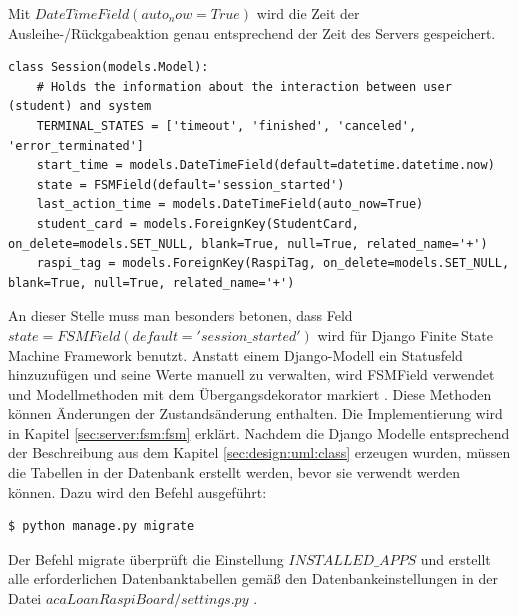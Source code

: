 Mit $DateTimeField(auto_now=True)$ wird die Zeit der Ausleihe-/Rückgabeaktion genau entsprechend der Zeit des Servers gespeichert. 
\begin{lstlisting}[caption={Session Modell},captionpos=b]
class Session(models.Model):
	# Holds the information about the interaction between user (student) and system
	TERMINAL_STATES = ['timeout', 'finished', 'canceled', 'error_terminated']
	start_time = models.DateTimeField(default=datetime.datetime.now)
	state = FSMField(default='session_started')
	last_action_time = models.DateTimeField(auto_now=True)
	student_card = models.ForeignKey(StudentCard, on_delete=models.SET_NULL, blank=True, null=True, related_name='+')
	raspi_tag = models.ForeignKey(RaspiTag, on_delete=models.SET_NULL, blank=True, null=True, related_name='+')
\end{lstlisting}
An dieser Stelle muss man besonders betonen, dass Feld $state = FSMField(default='session\_started')$ wird für Django Finite State Machine Framework benutzt. Anstatt einem Django-Modell ein Statusfeld hinzuzufügen und seine Werte manuell zu verwalten, wird FSMField verwendet und Modellmethoden mit dem Übergangsdekorator markiert \cite{website:fsm}. Diese Methoden können Änderungen der Zustandsänderung enthalten. Die Implementierung wird in Kapitel \ref{sec:server:fsm:fsm} erklärt. Nachdem die Django Modelle entsprechend der Beschreibung aus dem Kapitel \ref{sec:design:uml:class} erzeugen wurden, müssen die Tabellen in der Datenbank erstellt werden, bevor sie verwendt werden können. Dazu wird den  Befehl ausgeführt:
\begin{lstlisting}[caption={[Der Befehl migrate] },captionpos=b]
$ python manage.py migrate
\end{lstlisting}
Der Befehl migrate überprüft die Einstellung $INSTALLED\_APPS$ und erstellt alle erforderlichen Datenbanktabellen gemäß den Datenbankeinstellungen in der Datei $acaLoanRaspiBoard/settings.py$ \cite{website:15}.

